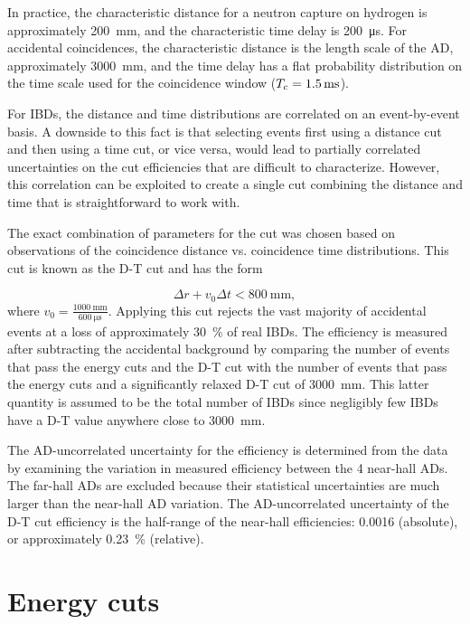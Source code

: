 In practice, the characteristic distance for a neutron capture on hydrogen
is approximately \SI{200}{\milli\meter},
and the characteristic time delay is \SI{200}{\micro\second}.
For accidental coincidences, the characteristic distance is
the length scale of the AD, approximately \SI{3000}{\milli\meter},
and the time delay has a flat probability distribution
on the time scale used for the coincidence window ($T_c = \SI{1.5}{\milli\second}$).

For IBDs, the distance and time distributions are correlated
on an event-by-event basis.
A downside to this fact is that selecting events first using a distance cut
and then using a time cut, or vice versa,
would lead to partially correlated uncertainties on the cut efficiencies
that are difficult to characterize.
However, this correlation can be exploited to create a single cut
combining the distance and time that is straightforward to work with.

The exact combination of parameters for the cut was chosen based on observations
of the coincidence distance vs. coincidence time distributions.
This cut is known as the D-T cut and has the form

\begin{equation}
    \Delta r + v_0 \Delta t < \SI{800}{\milli\meter},
\end{equation}
where $v_0 = \frac{\SI{1000}{\milli\meter}}{\SI{600}{\micro\second}}$.
Applying this cut rejects the vast majority of accidental events
at a loss of approximately \SI{30}{\percent} of real IBDs.
The efficiency is measured after subtracting the accidental background
by comparing the number of events that pass the energy cuts and the D-T cut
with the number of events that pass the energy cuts
and a significantly relaxed D-T cut of \SI{3000}{\milli\meter}.
This latter quantity is assumed to be the total number of IBDs
since negligibly few IBDs have a D-T value anywhere close to \SI{3000}{\milli\meter}.

The AD-uncorrelated uncertainty for the efficiency
is determined from the data by examining the variation
in measured efficiency between the 4 near-hall ADs.
The far-hall ADs are excluded because
their statistical uncertainties are much larger than the
near-hall AD variation.
The AD-uncorrelated uncertainty of the D-T cut efficiency
is the half-range of the near-hall efficiencies: \num{0.0016} (absolute),
or approximately \SI{0.23}{\percent} (relative).

\section{Energy cuts}

